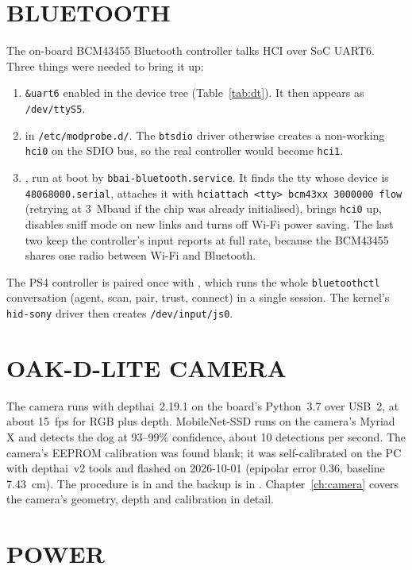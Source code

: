 \section{BLUETOOTH}
\label{sec:bt}

The on-board BCM43455 Bluetooth controller talks HCI over SoC UART6. Three
things were needed to bring it up:
\begin{enumerate}
\item \texttt{\&uart6} enabled in the device tree (Table~\ref{tab:dt}). It then
  appears as \texttt{/dev/ttyS5}.
\item {} in \texttt{/etc/modprobe.d/}. The
  \texttt{btsdio} driver otherwise creates a non-working \texttt{hci0} on the
  SDIO bus, so the real controller would become \texttt{hci1}.
\item {}, run at boot by
  \texttt{bbai-bluetooth.service}. It finds the tty whose device is
  \texttt{48068000.serial}, attaches it with
  \texttt{hciattach <tty> bcm43xx 3000000 flow} (retrying at \SI{3}{Mbaud} if
  the chip was already initialised), brings \texttt{hci0} up, disables sniff
  mode on new links and turns off Wi-Fi power saving. The last two keep the
  controller's input reports at full rate, because the BCM43455 shares one
  radio between Wi-Fi and Bluetooth.
\end{enumerate}
The PS4 controller is paired once with , which runs the
whole \texttt{bluetoothctl} conversation (agent, scan, pair, trust, connect)
in a single session. The kernel's \texttt{hid-sony} driver then creates
\texttt{/dev/input/js0}.

\section{OAK-D-LITE CAMERA}

The camera runs with depthai~2.19.1 on the board's Python~3.7 over USB~2, at
about \SI{15}{fps} for RGB plus depth. MobileNet-SSD runs on the camera's
Myriad X and detects the dog at 93--99\% confidence, about 10 detections per
second. The camera's EEPROM calibration was found blank; it was
self-calibrated on the PC with depthai~v2 tools and flashed on 2026-10-01
(epipolar error 0.36, baseline \SI{7.43}{cm}). The procedure is in
 and the backup is in .
Chapter~\ref{ch:camera} covers the camera's geometry, depth and
calibration in detail.

\section{POWER}
\label{sec:power}

